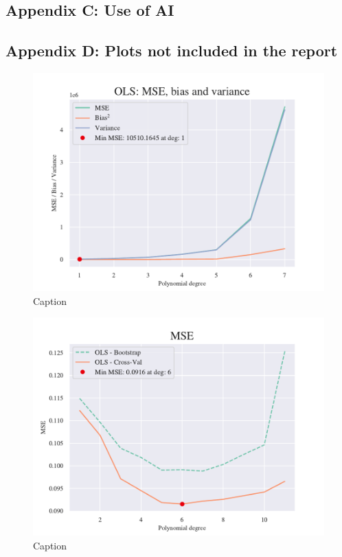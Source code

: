 \subsection{Appendix C: Use of AI} \label{appendixC}





\subsection{Appendix D: Plots not included in the report} \label{appendixD}

\begin{figure}
    \centering
    \includegraphics[width=1\linewidth]{project_1/figures/figures_in_appendix/bias_var_terrain_bootstrap.pdf}
    \caption{Caption}
    \label{fig:ref}
\end{figure}

\begin{figure}
    \centering
    \includegraphics[width=1\linewidth]{project_1/figures/figures_in_appendix/CV_BS_OLS_Franke_Noise.pdf}
    \caption{Caption}
    \label{fig:ref}
\end{figure}

